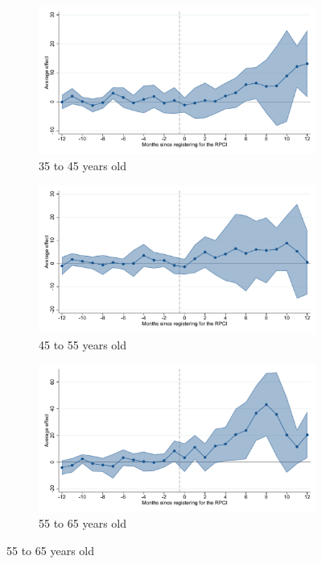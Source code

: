 \begin{figure}[H]
    \begin{subfigure}{0.32\textwidth}
    \caption{35 to 45 years old}
    \includegraphics[width=\textwidth]{04_Figures/muestra_10porciento/event_study_sal_cierre_age_35_45_dcdh_connected.pdf}
    \end{subfigure}
    \begin{subfigure}{0.32\textwidth}
    \caption{45 to 55 years old}
    \includegraphics[width=\textwidth]{04_Figures/muestra_10porciento/event_study_sal_cierre_age_45_55_dcdh_connected.pdf}
    \end{subfigure}
    \begin{subfigure}{0.32\textwidth}
    \caption{55 to 65 years old}
    \includegraphics[width=\textwidth]{04_Figures/muestra_10porciento/event_study_sal_cierre_age_55_65_dcdh_connected.pdf}
    \end{subfigure}


\end{figure}
